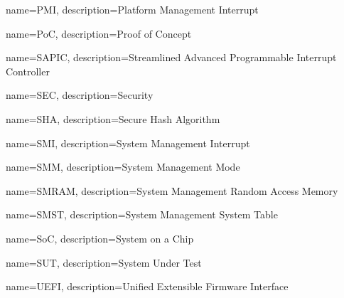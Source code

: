  {
	name=PMI,
	description={Platform Management Interrupt
	}
}

 {
	name=PoC,
	description={Proof of Concept
	}
}

 {
	name=SAPIC,
	description={Streamlined Advanced Programmable Interrupt Controller
	}
}

 {
	name=SEC,
	description={Security
	}
}

 {
	name=SHA,
	description={Secure Hash Algorithm
	}
}

 {
	name=SMI,
	description={System Management Interrupt
	}
}

 {
	name=SMM,
	description={System Management Mode
	}
}


 {
	name=SMRAM,
	description={System Management Random Access Memory
	}
}


 {
	name=SMST,
	description={System Management System Table
	}
}

 {
	name=SoC,
	description={System on a Chip
	}
}


 {
	name=SUT,
	description={System Under Test
	}
}

 {
	name=UEFI,
	description={Unified Extensible Firmware Interface
	}
}

